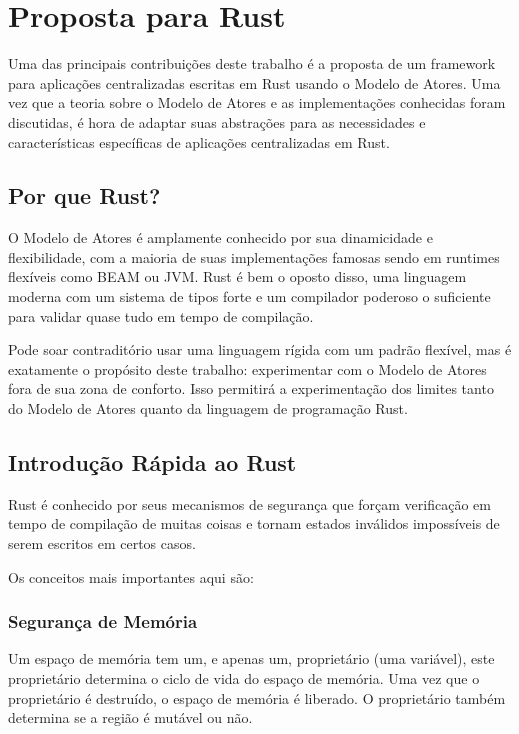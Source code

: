 \section{Proposta para Rust}

Uma das principais contribuições deste trabalho é a proposta de um framework para aplicações centralizadas escritas em Rust usando o Modelo de Atores. Uma vez que a teoria sobre o Modelo de Atores e as implementações conhecidas foram discutidas, é hora de adaptar suas abstrações para as necessidades e características específicas de aplicações centralizadas em Rust.

\subsection{Por que Rust?}

O Modelo de Atores é amplamente conhecido por sua dinamicidade e flexibilidade, com a maioria de suas implementações famosas sendo em runtimes flexíveis como BEAM ou JVM. Rust é bem o oposto disso, uma linguagem moderna com um sistema de tipos forte e um compilador poderoso o suficiente para validar quase tudo em tempo de compilação.

Pode soar contraditório usar uma linguagem rígida com um padrão flexível, mas é exatamente o propósito deste trabalho: experimentar com o Modelo de Atores fora de sua zona de conforto. Isso permitirá a experimentação dos limites tanto do Modelo de Atores quanto da linguagem de programação Rust.

\subsection{Introdução Rápida ao Rust}

Rust é conhecido por seus mecanismos de segurança que forçam verificação em tempo de compilação de muitas coisas e tornam estados inválidos impossíveis de serem escritos em certos casos.

Os conceitos mais importantes aqui são:

\subsubsection{Segurança de Memória}

Um espaço de memória tem um, e apenas um, proprietário (uma variável), este proprietário determina o ciclo de vida do espaço de memória. Uma vez que o proprietário é destruído, o espaço de memória é liberado. O proprietário também determina se a região é mutável ou não.

